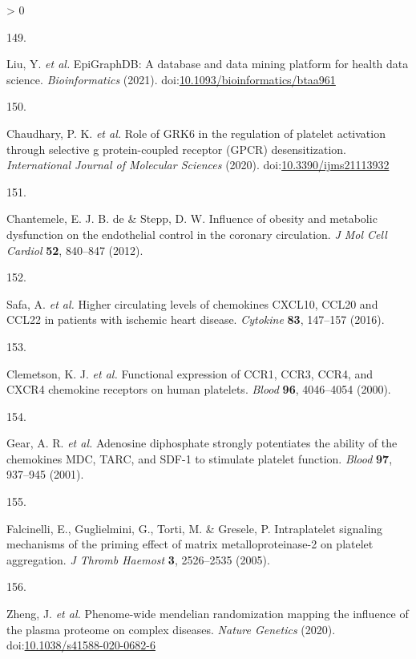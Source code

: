 \documentclass[11pt,twoside]{bristolthesis}
\newlength{\cslhangindent}
\newlength{\csllabelwidth}
\newenvironment{CSLReferences}[2] %
 {%
  \setlength{\parindent}{0pt}
  \ifodd #1 \everypar{\setlength{\hangindent}{\cslhangindent}}\ignorespaces\fi
  \ifnum #2 > 0
  \setlength{\parskip}{#2\baselineskip}
  \fi
 }%
 {}
\newcommand{\CSLLeftMargin}[1]{\parbox[t]{\csllabelwidth}{#1}}
\newcommand{\CSLRightInline}[1]{\parbox[t]{\linewidth - \csllabelwidth}{#1}\break}
\begin{document}
\begin{CSLReferences}{0}{0}
\leavevmode\hypertarget{ref-Liu2021}{}%
\CSLLeftMargin{149. }
\CSLRightInline{Liu, Y. \emph{et al.} EpiGraphDB: A database and data mining platform for health data science. \emph{Bioinformatics} (2021). doi:\href{https://doi.org/10.1093/bioinformatics/btaa961}{10.1093/bioinformatics/btaa961}}

\leavevmode\hypertarget{ref-Chaudhary2020}{}%
\CSLLeftMargin{150. }
\CSLRightInline{Chaudhary, P. K. \emph{et al.} Role of GRK6 in the regulation of platelet activation through selective g protein-coupled receptor (GPCR) desensitization. \emph{International Journal of Molecular Sciences} (2020). doi:\href{https://doi.org/10.3390/ijms21113932}{10.3390/ijms21113932}}

\leavevmode\hypertarget{ref-BelindeChantemele2012a}{}%
\CSLLeftMargin{151. }
\CSLRightInline{Chantemele, E. J. B. de \& Stepp, D. W. Influence of obesity and metabolic dysfunction on the endothelial control in the coronary circulation. \emph{J Mol Cell Cardiol} \textbf{52}, 840--847 (2012).}

\leavevmode\hypertarget{ref-Safa2016}{}%
\CSLLeftMargin{152. }
\CSLRightInline{Safa, A. \emph{et al.} Higher circulating levels of chemokines CXCL10, CCL20 and CCL22 in patients with ischemic heart disease. \emph{Cytokine} \textbf{83}, 147--157 (2016).}

\leavevmode\hypertarget{ref-Clemetson2000}{}%
\CSLLeftMargin{153. }
\CSLRightInline{Clemetson, K. J. \emph{et al.} Functional expression of CCR1, CCR3, CCR4, and CXCR4 chemokine receptors on human platelets. \emph{Blood} \textbf{96}, 4046--4054 (2000).}

\leavevmode\hypertarget{ref-Gear2001}{}%
\CSLLeftMargin{154. }
\CSLRightInline{Gear, A. R. \emph{et al.} Adenosine diphosphate strongly potentiates the ability of the chemokines MDC, TARC, and SDF-1 to stimulate platelet function. \emph{Blood} \textbf{97}, 937--945 (2001).}

\leavevmode\hypertarget{ref-Falcinelli2005}{}%
\CSLLeftMargin{155. }
\CSLRightInline{Falcinelli, E., Guglielmini, G., Torti, M. \& Gresele, P. Intraplatelet signaling mechanisms of the priming effect of matrix metalloproteinase-2 on platelet aggregation. \emph{J Thromb Haemost} \textbf{3}, 2526--2535 (2005).}

\leavevmode\hypertarget{ref-Zheng2020}{}%
\CSLLeftMargin{156. }
\CSLRightInline{Zheng, J. \emph{et al.} Phenome-wide mendelian randomization mapping the influence of the plasma proteome on complex diseases. \emph{Nature Genetics} (2020). doi:\href{https://doi.org/10.1038/s41588-020-0682-6}{10.1038/s41588-020-0682-6}}


\end{CSLReferences}
\end{document}

